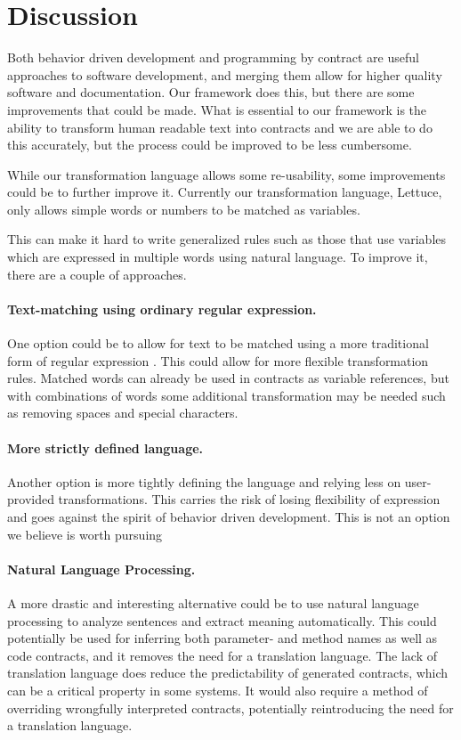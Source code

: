 \section{Discussion}
Both behavior driven development and programming by contract are useful approaches to software development, and merging them allow for higher quality software and documentation.
Our framework does this, but there are some improvements that could be made.
What is essential to our framework is the ability to transform human readable text into contracts and we are able to do this accurately, but the process could be improved to be less cumbersome.

While our transformation language allows some re-usability, some improvements could be to further improve it.
Currently our transformation language, Lettuce, only allows simple words or numbers to be matched as variables.

This can make it hard to write generalized rules such as those that use variables which are expressed in multiple words using natural language.
To improve it, there are a couple of approaches.

\paragraph{Text-matching using ordinary regular expression.}
One option could be to allow for text to be matched using a more traditional form of regular expression \cite{thompson1968programming}.
This could allow for more flexible transformation rules.
Matched words can already be used in contracts as variable references, but with combinations of words some additional transformation may be needed such as removing spaces and special characters.

\paragraph{More strictly defined language.}
Another option is more tightly defining the language and relying less on user-provided transformations.
This carries the risk of losing flexibility of expression and goes against the spirit of behavior driven development.
This is not an option we believe is worth pursuing

\paragraph{Natural Language Processing.}
A more drastic and interesting alternative could be to use natural language processing \cite{jurafsky2002speech} to analyze sentences and extract meaning automatically.
This could potentially be used for inferring both parameter- and method names as well as code contracts, and it removes the need for a translation language.
The lack of translation language does reduce the predictability of generated contracts, which can be a critical property in some systems.
It would also require a method of overriding wrongfully interpreted contracts, potentially reintroducing the need for a translation language.

